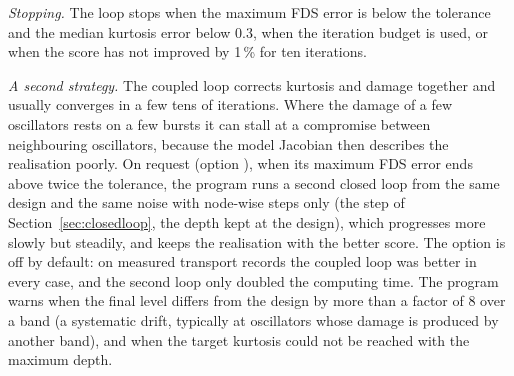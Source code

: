 \emph{Stopping.} The loop stops when the maximum FDS error is below the tolerance and the median
kurtosis error below 0.3, when the iteration budget is used, or when the score has not improved by
1\,\% for ten iterations.

\emph{A second strategy.} The coupled loop corrects kurtosis and damage together and usually
converges in a few tens of iterations. Where the damage of a few oscillators rests on a few bursts it
can stall at a compromise between neighbouring oscillators, because the model Jacobian then
describes the realisation poorly. On request (option ), when its maximum FDS error ends
above twice the tolerance, the program runs a second closed loop from the same design and the same
noise with node-wise steps only (the step of Section~\ref{sec:closedloop}, the depth kept at the
design), which progresses more slowly but steadily, and keeps the realisation with the better score.
The option is off by default: on measured transport records the coupled loop was better in every
case, and the second loop only doubled the computing time. The program warns when the final level differs from the design by more than
a factor of 8 over a band (a systematic drift, typically at oscillators whose damage is produced by
another band), and when the target kurtosis could not be reached with the maximum depth.
